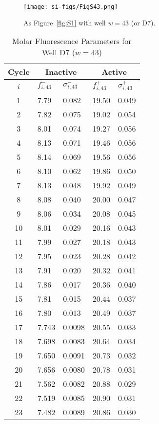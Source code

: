                 \begin{figure}
                    \centering
                    \texttt{[image: si-figs/FigS43.png]}
                    \caption{
                        As Figure~\ref{fig:S1} with well $w=43$ (or D7).
                    }
                \end{figure}
                \clearpage
    \begin{table}
        \caption{Molar Fluorescence Parameters for Well D7 ($w=43$)}
        \centering
        \begin{tabular}{c|ll|ll}
            Cycle & \multicolumn{2}{c|}{Inactive} & \multicolumn{2}{c}{Active} \\
            \hline
            $i$ & $f_{i,43}^{-}$ & $\sigma_{i,43}^{-}$ &  $f_{i,43}^{+}$ & $\sigma_{i,43}^{+}$ \\
            \hline
    1 & 7.79 & 0.082 & 19.50 & 0.049 \\
2 & 7.82 & 0.075 & 19.02 & 0.054 \\
3 & 8.01 & 0.074 & 19.27 & 0.056 \\
4 & 8.13 & 0.071 & 19.46 & 0.056 \\
5 & 8.14 & 0.069 & 19.56 & 0.056 \\
6 & 8.10 & 0.062 & 19.86 & 0.050 \\
7 & 8.13 & 0.048 & 19.92 & 0.049 \\
8 & 8.08 & 0.040 & 20.00 & 0.047 \\
9 & 8.06 & 0.034 & 20.08 & 0.045 \\
10 & 8.01 & 0.029 & 20.16 & 0.043 \\
11 & 7.99 & 0.027 & 20.18 & 0.043 \\
12 & 7.95 & 0.023 & 20.28 & 0.042 \\
13 & 7.91 & 0.020 & 20.32 & 0.041 \\
14 & 7.86 & 0.017 & 20.36 & 0.040 \\
15 & 7.81 & 0.015 & 20.44 & 0.037 \\
16 & 7.80 & 0.013 & 20.49 & 0.037 \\
17 & 7.743 & 0.0098 & 20.55 & 0.033 \\
18 & 7.698 & 0.0083 & 20.64 & 0.034 \\
19 & 7.650 & 0.0091 & 20.73 & 0.032 \\
20 & 7.656 & 0.0080 & 20.78 & 0.031 \\
21 & 7.562 & 0.0082 & 20.88 & 0.029 \\
22 & 7.519 & 0.0085 & 20.90 & 0.031 \\
23 & 7.482 & 0.0089 & 20.86 & 0.030 \\

\end{tabular}
\end{table}
